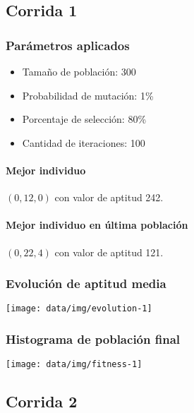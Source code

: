 \documentclass[a4paper,12pt]{article}
\begin{document}
\newpage


\subsection{Corrida 1}

\subsubsection*{Parámetros aplicados}

\begin{multicols}{2}
\begin{itemize}
	\item Tamaño de población: 300
	\item Probabilidad de mutación: 1\%
	\item Porcentaje de selección: 80\%
	\item Cantidad de iteraciones: 100
\end{itemize}
\end{multicols}

\paragraph*{Mejor individuo}

$(0, 12, 0)$ con valor de aptitud 242.

\paragraph*{Mejor individuo en última población}

$(0, 22, 4)$ con valor de aptitud 121.

\subsubsection*{Evolución de aptitud media}

\texttt{[image: data/img/evolution-1]}

\subsubsection*{Histograma de población final}

\texttt{[image: data/img/fitness-1]}

\subsection{Corrida 2}
\end{document}
